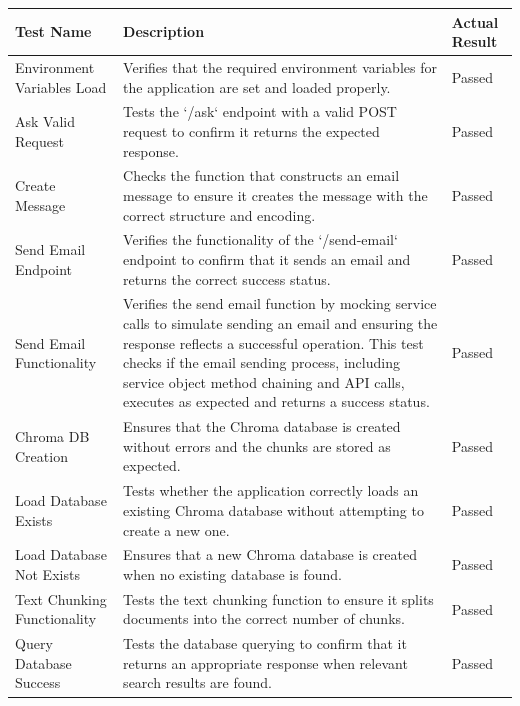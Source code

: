 \documentclass{l4proj}
\begin{document}
\begin{appendices}
\begin{table}[!ht]
\centering
\renewcommand{\arraystretch}{1.65} %
\begin{tabular}{
    |>{\centering\arraybackslash}m{3.5cm}
    |m{7.5cm}
    |>{\centering\arraybackslash}m{2.5cm}|}
\hline
\rowcolor{HeaderColor}Test Name & Description & Actual Result \\
\hline
\rowcolor{RowColor}Environment Variables Load & Verifies that the required environment variables for the application are set and loaded properly. & Passed \\
\hline
Ask Valid Request & Tests the `/ask` endpoint with a valid POST request to confirm it returns the expected response. & Passed \\
\hline
\rowcolor{RowColor}Create Message & Checks the function that constructs an email message to ensure it creates the message with the correct structure and encoding. & Passed \\
\hline
Send Email Endpoint & Verifies the functionality of the `/send-email` endpoint to confirm that it sends an email and returns the correct success status. & Passed \\
\hline
\rowcolor{RowColor}Send Email Functionality & Verifies the send email function by mocking service calls to simulate sending an email and ensuring the response reflects a successful operation. This test checks if the email sending process, including service object method chaining and API calls, executes as expected and returns a success status. & Passed \\
\hline
\rowcolor{RowColor}Chroma DB Creation & Ensures that the Chroma database is created without errors and the chunks are stored as expected. & Passed \\
\hline
Load Database Exists & Tests whether the application correctly loads an existing Chroma database without attempting to create a new one. & Passed \\
\hline
\rowcolor{RowColor}Load Database Not Exists & Ensures that a new Chroma database is created when no existing database is found. & Passed \\
\hline
Text Chunking Functionality & Tests the text chunking function to ensure it splits documents into the correct number of chunks. & Passed \\
\hline
\rowcolor{RowColor}Query Database Success & Tests the database querying to confirm that it returns an appropriate response when relevant search results are found. & Passed \\

\end{tabular}
\end{table}
\end{appendices}
\end{document}

